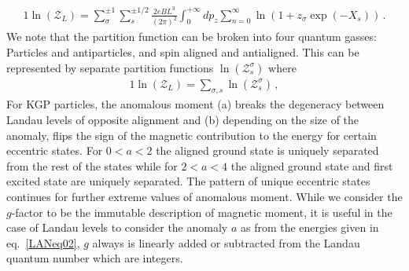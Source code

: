 \documentclass[
aps,
pra,
showpacs,
preprintnumbers,
amsmath,
amssymb,
footinbib
]{revtex4-2}
\begin{document}
\begin{alignat}{1}
    \label{PartFuncOne} \ln\left(\mathcal{Z}_{L}\right)=\sum_{\sigma}^{\pm1}\sum_{s}^{\pm1/2}\frac{2eBL^{3}}{(2\pi)^{2}}\int^{+\infty}_{0}dp_{z}\sum_{n=0}^{\infty}\ln\left(1+z_{\sigma}\exp(-X_{s})\right)\,.
\end{alignat}
We note that the partition function can be broken into four quantum gasses: Particles and antiparticles, and spin aligned and antialigned. This can be represented by separate partition functions $\ln\left(\mathcal{Z}^{\sigma}_{s}\right)$ where
\begin{alignat}{1}
    \label{FourGasses} \ln\left(\mathcal{Z}_{L}\right)=\sum_{\sigma,s}\ln\left(\mathcal{Z}^{\sigma}_{s}\right)\,,
\end{alignat}
For KGP particles, the anomalous moment (a) breaks the degeneracy between Landau levels of opposite alignment and (b) depending on the size of the anomaly, flips the sign of the magnetic contribution to the energy for certain eccentric states. For $0<a<2$ the aligned ground state is uniquely separated from the rest of the states while for $2<a<4$ the aligned ground state and first excited state are uniquely separated. The pattern of unique eccentric states continues for further extreme values of anomalous moment. While we consider the $g$-factor to be the immutable description of magnetic moment, it is useful in the case of Landau levels to consider the anomaly $a$ as from the energies given in eq.~\eqref{LANeq02}, $g$ always is linearly added or subtracted from the Landau quantum number which are integers.
\end{document}
